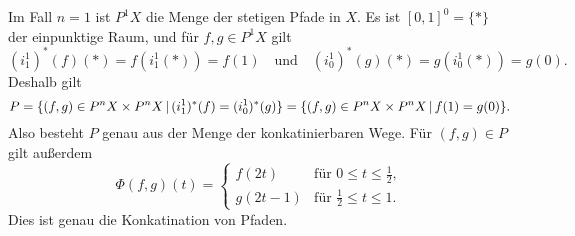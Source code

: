 Im Fall $n = 1$ ist $P^1 X$ die Menge der stetigen Pfade in $X$.
Es ist $[0,1]^0 = \{*\}$ der einpunktige Raum, und für $f, g \in P^1 X$ gilt
\[
    (i_1^1)^*(f)(*)
  = f(i_1^1(*))
  = f(1)
  \quad\text{und}\quad
    (i_0^1)^*(g)(*)
  = g(i_0^1(*))
  = g(0).
\]
Deshalb gilt
\[
    P
  = \{
      (f,g) \in P^n X \times P^n X
    \,|\,
      (i_1^1)^*(f) = (i_0^1)^*(g)
    \}
  = \{
      (f,g) \in P^n X \times P^n X
    \,|\,
      f(1) = g(0)
    \}.
\]
Also besteht $P$ genau aus der Menge der konkatinierbaren Wege.
Für $(f,g) \in P$ gilt außerdem
\[
    \Phi(f,g)(t)
  = \begin{cases}
      f(2t)   & \text{für $0 \leq t \leq \frac{1}{2}$}, \\
      g(2t-1) & \text{für $\frac{1}{2} \leq t \leq 1$}.
    \end{cases}
\]
Dies ist genau die Konkatination von Pfaden.





